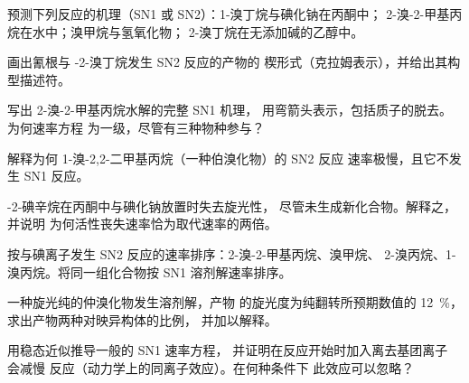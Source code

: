 \begin{exercise}[$\star$]\label{exo:b1:nucleophilic-substitution:3}
预测下列反应的机理（SN1 或 SN2）：1-溴丁烷与碘化钠在丙酮中；
2-溴-2-甲基丙烷在水中；溴甲烷与氢氧化物；
2-溴丁烷在无添加碱的乙醇中。
\end{exercise}

\begin{exercise}[$\star$]\label{exo:b1:nucleophilic-substitution:4}
画出氰根与 -2-溴丁烷发生 SN2 反应的产物的
楔形式（克拉姆表示），并给出其构型描述符。
\end{exercise}

\begin{exercise}[$\star\star$]\label{exo:b1:nucleophilic-substitution:5}
写出 2-溴-2-甲基丙烷水解的完整 SN1 机理，
用弯箭头表示，包括质子的脱去。为何速率方程
为一级，尽管有三种物种参与？
\end{exercise}

\begin{exercise}[$\star\star$]\label{exo:b1:nucleophilic-substitution:6}
解释为何 1-溴-2,2-二甲基丙烷（一种伯溴化物）的 SN2 反应
速率极慢，且它不发生 SN1 反应。
\end{exercise}

\begin{exercise}[$\star\star$]\label{exo:b1:nucleophilic-substitution:7}
-2-碘辛烷在丙酮中与碘化钠放置时失去旋光性，
尽管未生成新化合物。解释之，并说明
为何活性丧失速率恰为取代速率的两倍。
\end{exercise}

\begin{exercise}[$\star\star$]\label{exo:b1:nucleophilic-substitution:8}
按与碘离子发生 SN2 反应的速率排序：2-溴-2-甲基丙烷、溴甲烷、
2-溴丙烷、1-溴丙烷。将同一组化合物按 SN1
溶剂解速率排序。
\end{exercise}

\begin{exercise}[$\star\star$]\label{exo:b1:nucleophilic-substitution:9}
一种旋光纯的仲溴化物发生溶剂解，产物
的旋光度为纯翻转所预期数值的 \qty{12}{\percent}，
求出产物两种对映异构体的比例，
并加以解释。
\end{exercise}

\begin{exercise}[$\star\star\star$]\label{exo:b1:nucleophilic-substitution:10}
用稳态近似推导一般的 SN1 速率方程，
并证明在反应开始时加入离去基团离子  会减慢
反应（动力学上的同离子效应）。在何种条件下
此效应可以忽略？
\end{exercise}


